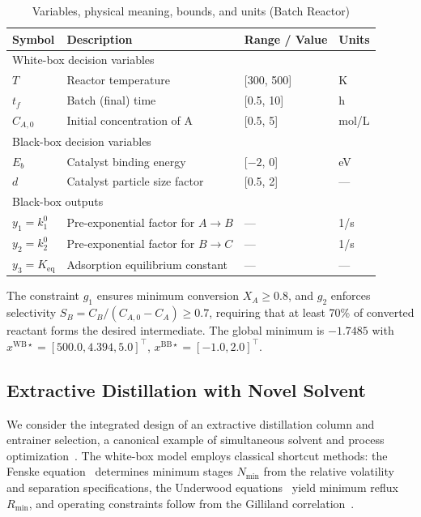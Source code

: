 \documentclass[12pt,a4paper]{article}%
\theoremstyle{plain}%
\theoremstyle{remark}%
\theoremstyle{definition}%
\def\WB{\mathrm{WB}}
\def\BB{\mathrm{BB}}
\begin{document}
\begin{appendices}
\begin{table}[htbp]
\centering
\caption{Variables, physical meaning, bounds, and units (Batch Reactor)}
\label{tab:batch_reactor_vars}
\begin{tabular}{@{}llll@{}}
\toprule
\textbf{Symbol} & \textbf{Description} & \textbf{Range / Value} & \textbf{Units} \\
\midrule
\multicolumn{4}{l}{White-box decision variables} \\
\midrule
$T$ & Reactor temperature & [300, 500] & K \\
$t_f$ & Batch (final) time & [0.5, 10] & h \\
$C_{A,0}$ & Initial concentration of A & [0.5, 5] & mol/L \\
\midrule
\multicolumn{4}{l}{Black-box decision variables} \\
\midrule
$E_b$ & Catalyst binding energy & [$-2$, 0] & eV \\
$d$ & Catalyst particle size factor & [0.5, 2] & --- \\
\midrule
\multicolumn{4}{l}{Black-box outputs} \\
\midrule
$y_1 = k_1^0$ & Pre-exponential factor for $A \to B$ & --- & 1/s \\
$y_2 = k_2^0$ & Pre-exponential factor for $B \to C$ & --- & 1/s \\
$y_3 = K_{\text{eq}}$ & Adsorption equilibrium constant & --- & --- \\
\bottomrule
\end{tabular}
\end{table}

The constraint $g_1$ ensures minimum conversion $X_A \geq 0.8$, and $g_2$ enforces selectivity $S_B = C_B/(C_{A,0} - C_A) \geq 0.7$, requiring that at least 70\% of converted reactant forms the desired intermediate. The global minimum is $-1.7485$ with $x^{\WB\star} = [500.0, 4.394, 5.0]^\top$, $x^{\BB\star} = [-1.0, 2.0]^\top$.

\subsection{Extractive Distillation with Novel Solvent}\label{subsec:app_distillation}

We consider the integrated design of an extractive distillation column and entrainer selection, a canonical example of simultaneous solvent and process optimization~\cite{kossack2008systematic,scheffczyk2018cosmo}. The white-box model employs classical shortcut methods: the Fenske equation~\cite{fenske1932fractionation} determines minimum stages $N_{\min}$ from the relative volatility and separation specifications, the Underwood equations~\cite{underwood1948fractional,kamath2010equation} yield minimum reflux $R_{\min}$, and operating constraints follow from the Gilliland correlation~\cite{gilliland1940multicomponent,grossmann2005optimal}.


\end{appendices}
\end{document}
